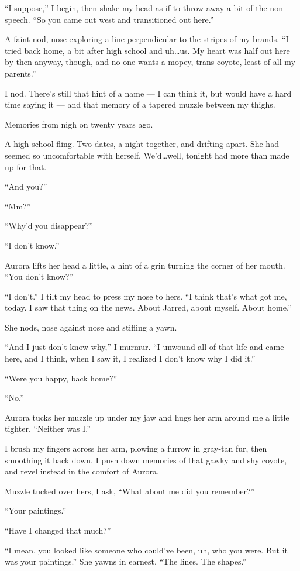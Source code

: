 ``I suppose,'' I begin, then shake my head as if to throw away a bit of the non-speech. ``So you came out west and transitioned out here.''

A faint nod, nose exploring a line perpendicular to the stripes of my brands. ``I tried back home, a bit after high school and uh\ldots{}us. My heart was half out here by then anyway, though, and no one wants a mopey, trans coyote, least of all my parents.''

I nod. There's still that hint of a name --- I can think it, but would have a hard time saying it --- and that memory of a tapered muzzle between my thighs.

Memories from nigh on twenty years ago.

A high school fling. Two dates, a night together, and drifting apart. She had seemed so uncomfortable with herself. We'd\ldots{}well, tonight had more than made up for that.

``And you?''

``Mm?''

``Why'd you disappear?''

``I don't know.''

Aurora lifts her head a little, a hint of a grin turning the corner of her mouth. ``You don't know?''

``I don't.'' I tilt my head to press my nose to hers. ``I think that's what got me, today. I saw that thing on the news. About Jarred, about myself. About home.''

She nods, nose against nose and stifling a yawn.

``And I just don't know why,'' I murmur. ``I unwound all of that life and came here, and I think, when I saw it, I realized I don't know why I did it.''

``Were you happy, back home?''

``No.''

Aurora tucks her muzzle up under my jaw and hugs her arm around me a little tighter. ``Neither was I.''

I brush my fingers across her arm, plowing a furrow in gray-tan fur, then smoothing it back down. I push down memories of that gawky and shy coyote, and revel instead in the comfort of Aurora.

Muzzle tucked over hers, I ask, ``What about me did you remember?''

``Your paintings.''

``Have I changed that much?''

``I mean, you looked like someone who could've been, uh, who you were. But it was your paintings.'' She yawns in earnest. ``The lines. The shapes.''


